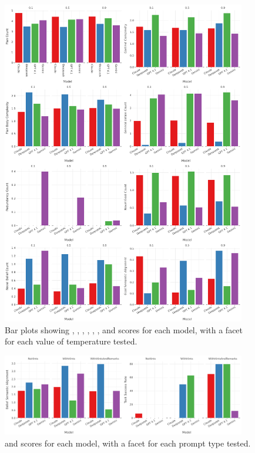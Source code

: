\documentclass[12pt,a4paper,openright,twoside]{book}
\begin{document}
\begin{figure}[htbp]
    \centering
    \includegraphics[width=0.95\textwidth]{figures/temperature-stats.pdf}
    \caption{Bar plots showing \PC{}, \CC{}, \PBC{}, \GC{}, \RR{}, \NGC{}, \NBC{} and \GSA{} scores for each model, with a facet for each value of temperature tested.}
    \label{fig:temp-stats}
\end{figure}

\begin{figure}[htbp]
    \centering
    \includegraphics[width=0.95\textwidth]{figures/prompt-stats2.pdf}
    \caption{\BSA{} and \TSR{} scores for each model, with a facet for each prompt type tested.}
    \label{fig:prompt-stats-cont}
\end{figure}
\end{document}
